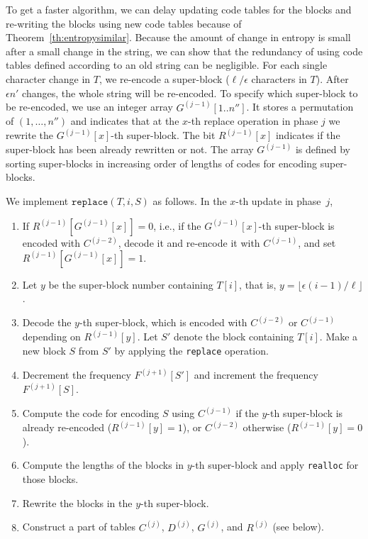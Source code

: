 \documentclass{llncs}
\begin{document}
To get a faster algorithm, we can delay updating code tables for the
blocks and re-writing the blocks using new code tables
because of Theorem~\ref{th:entropysimilar}.  Because the amount of change
in entropy is small after a small change in the string,  we can show that
the redundancy of using code tables defined according to an old string can be
negligible.  
For each single character change in $T$, we re-encode
a super-block ($\ell/\epsilon$ characters in $T$).
After $\epsilon n'$ changes, the whole string will be re-encoded.
To specify which super-block to be re-encoded,
we use an integer array $G^{(j-1)}[1..n'']$.
It stores a permutation of
$(1,\ldots,n'')$ and indicates
that at the $x$-th replace operation in phase $j$
we rewrite the $G^{(j-1)}[x]$-th super-block.
The bit $R^{(j-1)}[x]$ indicates 
if the super-block has been already rewritten or not.
The array $G^{(j-1)}$ is defined by sorting super-blocks
in increasing order of lengths of codes for encoding super-blocks.

We implement $\texttt{replace}(T, i, S)$ as follows.
In the $x$-th update in phase~$j$,
\begin{enumerate}
\item
If $R^{(j-1)}[G^{(j-1)}[x]]=0$, i.e., 
if the $G^{(j-1)}[x]$-th super-block is encoded with $C^{(j-2)}$,
decode it and re-encode it with $C^{(j-1)}$, and
set $R^{(j-1)}[G^{(j-1)}[x]] = 1$.
\item
Let $y$ be the super-block number containing $T[i]$,
 that is, $y = \lfloor \epsilon (i-1) / \ell \rfloor$.
\item
Decode the $y$-th super-block, which is encoded with $C^{(j-2)}$ or
$C^{(j-1)}$ depending on $R^{(j-1)}[y]$.
Let $S'$ denote the block containing $T[i]$.
Make a new block $S$ from $S'$ by applying the \texttt{replace} operation.
\item
Decrement the frequency $F^{(j+1)}[S']$ 
and increment the frequency $F^{(j+1)}[S]$.
\item
Compute the code for encoding $S$ using $C^{(j-1)}$ if the $y$-th super-block
is already re-encoded ($R^{(j-1)}[y]=1$), or $C^{(j-2)}$ otherwise ($R^{(j-1)}[y]=0$).
\item
Compute the lengths of the blocks in $y$-th super-block and apply
\texttt{realloc} for those blocks.
\item
Rewrite the blocks in the $y$-th super-block.
\item
Construct a part of tables $C^{(j)}$, $D^{(j)}$, $G^{(j)}$, and $R^{(j)}$
(see below).
\end{enumerate}
\end{document}
